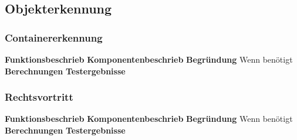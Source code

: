 \subsection{Objekterkennung}

\subsubsection{Containererkennung}
\textbf{Funktionsbeschrieb}
\textbf{Komponentenbeschrieb}
\textbf{Begründung}
Wenn benötigt
\textbf{Berechnungen}
\textbf{Testergebnisse}

\subsubsection{Rechtsvortritt}
\textbf{Funktionsbeschrieb}
\textbf{Komponentenbeschrieb}
\textbf{Begründung}
Wenn benötigt
\textbf{Berechnungen}
\textbf{Testergebnisse}